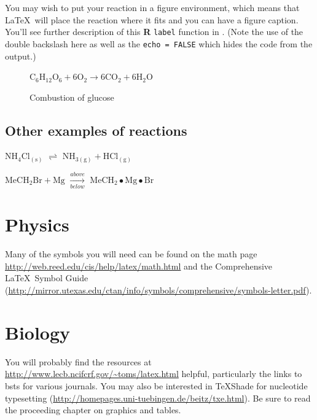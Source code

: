 \documentclass[12pt,twoside]{reedthesis}
\begin{document}
  You may wish to put your reaction in a figure environment, which means
  that \LaTeX~will place the reaction where it fits and you can have a
  figure caption. You'll see further description of this \textbf{R}
  \texttt{label} function in \protect\hyperlink{refux5flabels}{}. (Note
  the use of the double backslash here as well as the
  \texttt{echo\ =\ FALSE} which hides the code from the output.)
  
  \begin{figure}[h!tbp]
  \begin{center}
  $\mathrm{C_6H_{12}O_6  + 6O_2} \longrightarrow \mathrm{6CO_2 + 6H_2O}$
  \caption{Combustion of glucose}
  \label{fig:comb-gluc}
  \end{center}
  \end{figure}
  
  \subsection{Other examples of
  reactions}\label{other-examples-of-reactions}
  
  \(\mathrm{NH_4Cl_{(s)}}\) \(\rightleftharpoons\)
  \(\mathrm{NH_{3(g)}+HCl_{(g)}}\)
  
  \noindent \(\mathrm{MeCH_2Br + Mg}\) \(\xrightarrow[below]{above}\)
  \(\mathrm{MeCH_2\bullet Mg \bullet Br}\)
  
  \section{Physics}\label{physics}
  
  Many of the symbols you will need can be found on the math page
  \url{http://web.reed.edu/cis/help/latex/math.html} and the Comprehensive
  \LaTeX~Symbol Guide
  (\url{http://mirror.utexas.edu/ctan/info/symbols/comprehensive/symbols-letter.pdf}).
  
  \section{Biology}\label{biology}
  
  You will probably find the resources at
  \url{http://www.lecb.ncifcrf.gov/~toms/latex.html} helpful, particularly
  the links to bsts for various journals. You may also be interested in
  TeXShade for nucleotide typesetting
  (\url{http://homepages.uni-tuebingen.de/beitz/txe.html}). Be sure to
  read the proceeding chapter on graphics and tables.
  
  \begin{Shaded}
  \begin{Highlighting}[]
  \NormalTok{()}
  \end{Highlighting}
  \end{Shaded}
  
\end{document}
